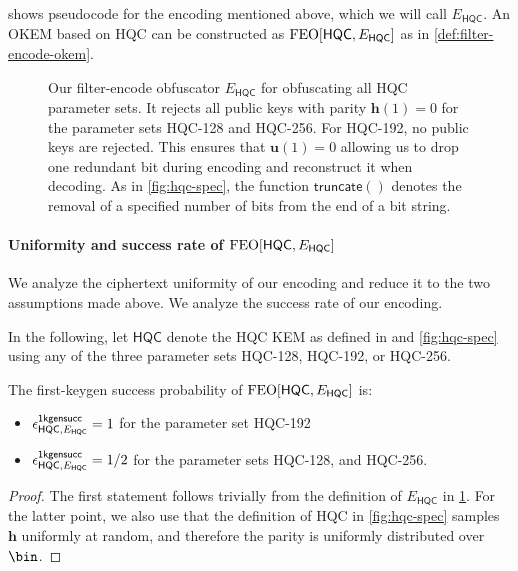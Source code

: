  shows pseudocode for the encoding mentioned above, which we will call $E_\mathsf{HQC}$. An OKEM based on HQC can be constructed as $\textsf{\textnormal{FEO}}[\mathsf{HQC}, E_\mathsf{HQC}]$ as in \cref{def:filter-encode-okem}.

\begin{figure}
    
    \caption[
        Our filter-encode obfuscator $E_\mathsf{HQC}$ for obfuscating all HQC parameter sets.
    ]{
        Our filter-encode obfuscator $E_\mathsf{HQC}$ for obfuscating all HQC parameter sets. It rejects all public keys with parity $\mathbf h(1)=0$ for the parameter sets HQC-128 and HQC-256. For HQC-192, no public keys are rejected. This ensures that $\mathbf u(1)=0$ allowing us to drop one redundant bit during encoding and reconstruct it when decoding. As in \cref{fig:hqc-spec}, the function $\mathsf{truncate}()$ denotes the removal of a specified number of bits from the end of a bit string.
    }
    \label{fig:hqc-encoding}
\end{figure}

\paragraph{Uniformity and success rate of $\textsf{\textnormal{FEO}}[\mathsf{HQC}, E_\mathsf{HQC}]$}

We analyze the ciphertext uniformity of our encoding and reduce it to the two assumptions made above. We analyze the success rate of our encoding.

In the following, let $\mathsf{HQC}$ denote the HQC KEM as defined in \cite{NISTPQC-R4:HQC22} and \cref{fig:hqc-spec} using any of the three parameter sets HQC-128, HQC-192, or HQC-256.

\begin{lemma}
\label{lem:hqc-first-keygen-success}
    The first-keygen success probability of $\textsf{\textnormal{FEO}}[\mathsf{HQC}, E_\mathsf{HQC}]$ is:
    \begin{itemize}
        \item $\epsilon^{\mathsf{1kgensucc}}_{\mathsf{HQC}, E_\mathsf{HQC}} = 1$ for the parameter set HQC-192
        \item $\epsilon^{\mathsf{1kgensucc}}_{\mathsf{HQC}, E_\mathsf{HQC}} = 1/2$ for the parameter sets HQC-128, and HQC-256.
    \end{itemize}
\end{lemma}
\begin{proof}
    The first statement follows trivially from the definition of $E_\mathsf{HQC}$ in \cref{fig:hqc-encoding}.
    For the latter point, we also use that the definition of HQC in \cref{fig:hqc-spec} samples $\mathbf h$ uniformly at random, and therefore the parity is uniformly distributed over $\bin$.
\end{proof}


